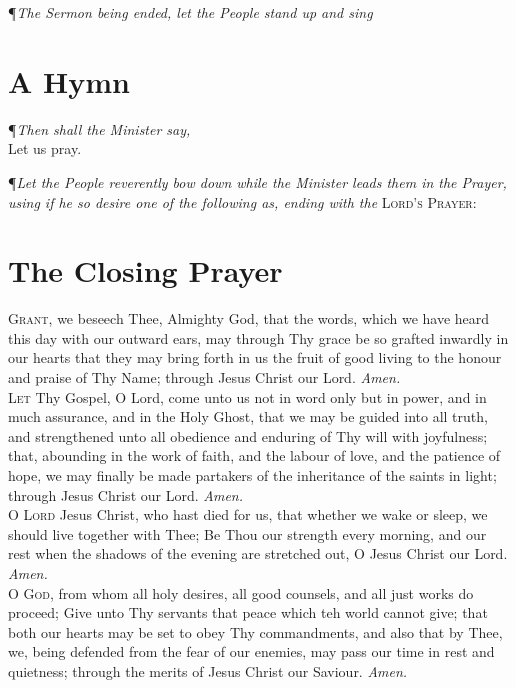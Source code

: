 {\centering \P \textit{The Sermon being ended, let the People stand up and sing}\par}

\section*{A Hymn}

\begin{center}
\P \textit{Then shall the Minister say,} \\
\vspace{1ex}
Let us pray. \\
\vspace{1ex}
\end{center}
\P \textit{Let the People reverently bow down while the Minister leads them in the Prayer, using if he so desire one of the following as, ending with the} \textsc{Lord's Prayer:}

\section*{The Closing Prayer}

\lettrine{G}{rant,} we beseech Thee, Almighty God, that the words, which we have heard this day with our outward ears, may through Thy grace be so grafted inwardly in our hearts that they may bring forth in us the fruit of good living to the honour and praise of Thy Name; through Jesus Christ our Lord.
\textit{Amen.} \\

\noindent\lettrine{L}{et} Thy Gospel, O Lord, come unto us not in word only but in power, and in much assurance, and in the Holy Ghost, that we may be guided into all truth, and strengthened unto all obedience and enduring of Thy will with joyfulness; that, abounding in the work of faith, and the labour of love, and the patience of hope, we may finally be made partakers of the inheritance of the saints in light; through Jesus Christ our Lord.
\textit{Amen.} \\

\noindent\lettrine{O}{ Lord} Jesus Christ, who hast died for us, that whether we wake or sleep, we should live together with Thee; Be Thou our strength every morning, and our rest when the shadows of the evening are stretched out, O Jesus Christ our Lord.
\textit{Amen.} \\

\noindent\lettrine{O}{ God,} from whom all holy desires, all good counsels, and all just works do proceed; Give unto Thy servants that peace which teh world cannot give; that both our hearts may be set to obey Thy commandments, and also that by Thee, we, being defended from the fear of our enemies, may pass our time in rest and quietness; through the merits of Jesus Christ our Saviour.
\textit{Amen.} \\

